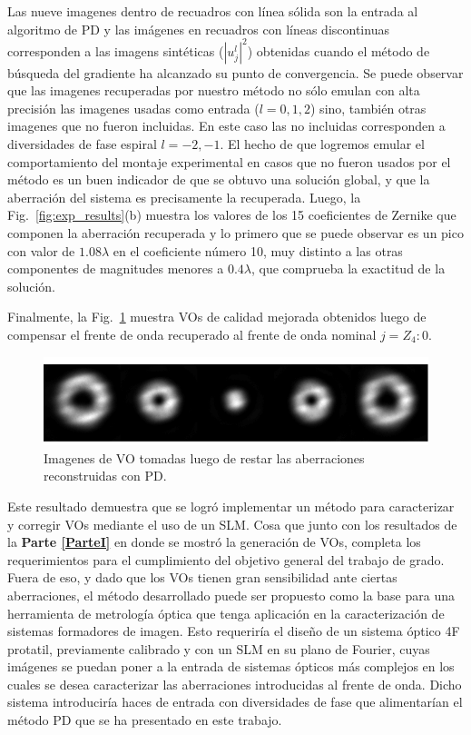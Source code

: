 Las nueve imagenes dentro de recuadros con línea sólida son la
entrada al algoritmo de PD y las imágenes en recuadros con líneas
discontinuas corresponden a las imagens sintéticas ($|u_j^l|^2$) obtenidas
cuando el método de búsqueda del gradiente ha alcanzado su punto de 
convergencia. Se puede observar que las imagenes
recuperadas por nuestro método no sólo emulan con alta precisión las
imagenes usadas como entrada ($l=0,1,2$) sino, también otras imagenes que no
fueron incluidas. En este caso las no incluidas corresponden a
diversidades de fase espiral $l=-2,-1$. El hecho de que logremos emular el comportamiento
del montaje experimental en casos que no fueron usados por el método
es un buen indicador de que se obtuvo una solución global, y que la
aberración del sistema es precisamente la recuperada. Luego, la
Fig.~\ref{fig:exp_results}(b) muestra los valores de los 15
coeficientes de 
Zernike que componen la aberración recuperada y lo primero que se puede
observar es un pico con valor de  $1.08\lambda$ en el coeficiente
número 10, muy distinto a las otras componentes de magnitudes menores
a $0.4\lambda$, que comprueba la exactitud de la solución.   

Finalmente, la Fig.~\ref{fig:exp_correction} muestra VOs de calidad mejorada obtenidos
luego de compensar el frente de onda recuperado al frente de
onda nominal $j = Z_4:0$.  

\begin{figure}[h!]
\centering
\includegraphics[scale=1.5]{PSF_comparison_experimental_results_07032015.pdf}
\caption[VO registrados luego restar las aberraciones detectadas
  con PD.]{Imagenes de VO tomadas luego de restar las aberraciones
    reconstruidas con PD.}  
\label{fig:exp_correction}
\end{figure}

Este resultado demuestra que se logró implementar un método para
caracterizar y corregir VOs mediante el uso de un SLM.  Cosa que junto
con los resultados de la \textbf{Parte \ref{ParteI}} en donde se
mostró la generación de VOs, completa los
requerimientos para el cumplimiento del objetivo general del trabajo
de grado. Fuera de eso, y dado que los VOs tienen gran sensibilidad ante ciertas
aberraciones, el método desarrollado puede ser propuesto como la base
para una herramienta de metrología óptica que tenga aplicación en la caracterización de sistemas
formadores de imagen. Esto requeriría el diseño de un sistema óptico 4F
protatil, previamente calibrado y con un SLM en su plano de Fourier, cuyas imágenes se puedan
poner a la entrada de sistemas ópticos más complejos en los cuales se
desea caracterizar las aberraciones introducidas al frente de
onda. Dicho sistema introduciría haces de entrada con diversidades de
fase que alimentarían el método PD que se ha presentado en este
trabajo. 

